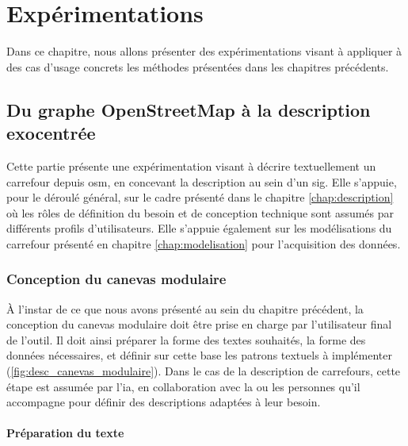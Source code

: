 \chapter{Expérimentations}
\label{chap:implementation}

Dans ce chapitre, nous allons présenter des expérimentations visant à appliquer à des cas d'usage concrets les méthodes présentées dans les chapitres précédents.

\section{Du graphe OpenStreetMap à la description exocentrée}

\label{sec:implementation_segmentation}

Cette partie présente une expérimentation visant à décrire textuellement un carrefour depuis \gls{osm}, en concevant la description au sein d'un \gls{sig}. Elle s'appuie, pour le déroulé général, sur le cadre présenté dans le chapitre \ref{chap:description} où les rôles de définition du besoin et de conception technique sont assumés par différents profils d'utilisateurs. Elle s'appuie également sur les modélisations du carrefour présenté en chapitre \ref{chap:modelisation} pour l'acquisition des données.

\subsection{Conception du canevas modulaire}

À l'instar de ce que nous avons présenté au sein du chapitre précédent, la conception du canevas modulaire doit être prise en charge par l'utilisateur final de l'outil. Il doit ainsi préparer la forme des textes souhaités, la forme des données nécessaires, et définir sur cette base les patrons textuels à implémenter (\ref{fig:desc_canevas_modulaire}). Dans le cas de la description de carrefours, cette étape est assumée par l'\gls{ia}, en collaboration avec la ou les personnes qu'il accompagne pour définir des descriptions adaptées à leur besoin.

\subsubsection{Préparation du texte}

